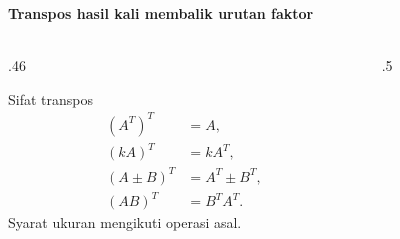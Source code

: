 \documentclass{../../kalkulus-ppt}
\begin{document}
\begin{frame}
    \frametitle{\insertsection}
    \framesubtitle{Transpos hasil kali membalik urutan faktor}
    \begin{columns}[c,onlytextwidth]
        \begin{column}{.46\textwidth}
            \begin{block}{Sifat transpos}
                \[
                    \begin{aligned}
                        (A^T)^T&=A,\\
                        (kA)^T&=kA^T,\\
                        (A\pm B)^T&=A^T\pm B^T,\\
                        (AB)^T&=B^T A^T.
                    \end{aligned}
                \]
                Syarat ukuran mengikuti operasi asal.
            \end{block}
        \end{column}
        \begin{column}{.5\textwidth}
        \end{column}
    \end{columns}
\end{frame}
\end{document}

